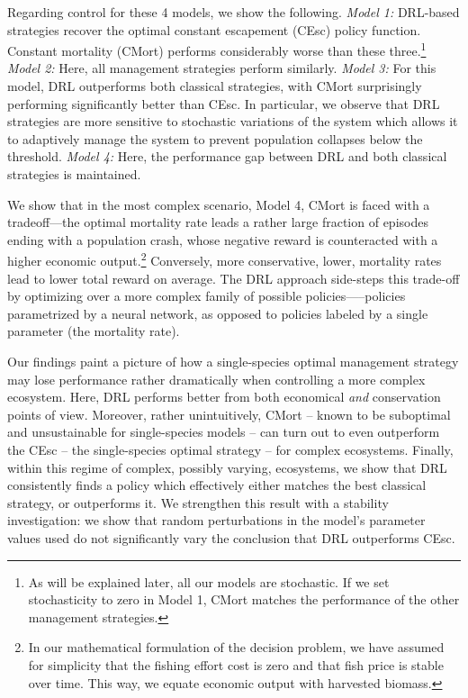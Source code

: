\documentclass{article}
\begin{document}
Regarding control for these 4 models, we show the following. \emph{Model
1:} DRL-based strategies recover the optimal constant escapement (CEsc)
policy function. Constant mortality (CMort) performs considerably worse
than these three.\footnote{
As will be explained later, all our models are stochastic. 
If we set stochasticity to zero in Model 1, CMort matches the performance of the other management strategies.
} \emph{Model 2:} Here, all management strategies perform similarly.
\emph{Model 3:} For this model, DRL outperforms both classical
strategies, with CMort surprisingly performing significantly better than
CEsc. In particular, we observe that DRL strategies are more sensitive
to stochastic variations of the system which allows it to adaptively
manage the system to prevent population collapses below the threshold.
\emph{Model 4:} Here, the performance gap between DRL and both classical
strategies is maintained.

We show that in the most complex scenario, Model 4, CMort is faced with
a tradeoff---the optimal mortality rate leads a rather large fraction of
episodes ending with a population crash, whose negative reward is
counteracted with a higher economic output.\footnote{
In our mathematical formulation of the decision problem, we have assumed for simplicity that the fishing effort cost is zero and that fish price is stable over time.
This way, we equate economic output with harvested biomass.
} Conversely, more conservative, lower, mortality rates lead to lower
total reward on average. The DRL approach side-steps this trade-off by
optimizing over a more complex family of possible policies-----policies
parametrized by a neural network, as opposed to policies labeled by a
single parameter (the mortality rate).

Our findings paint a picture of how a single-species optimal management
strategy may lose performance rather dramatically when controlling a
more complex ecosystem. Here, DRL performs better from both economical
\emph{and} conservation points of view. Moreover, rather unintuitively,
CMort -- known to be suboptimal and unsustainable for single-species
models -- can turn out to even outperform the CEsc -- the single-species
optimal strategy -- for complex ecosystems. Finally, within this regime
of complex, possibly varying, ecosystems, we show that DRL consistently
finds a policy which effectively either matches the best classical
strategy, or outperforms it. We strengthen this result with a stability
investigation: we show that random perturbations in the model's
parameter values used do not significantly vary the conclusion that DRL
outperforms CEsc.
\end{document}
